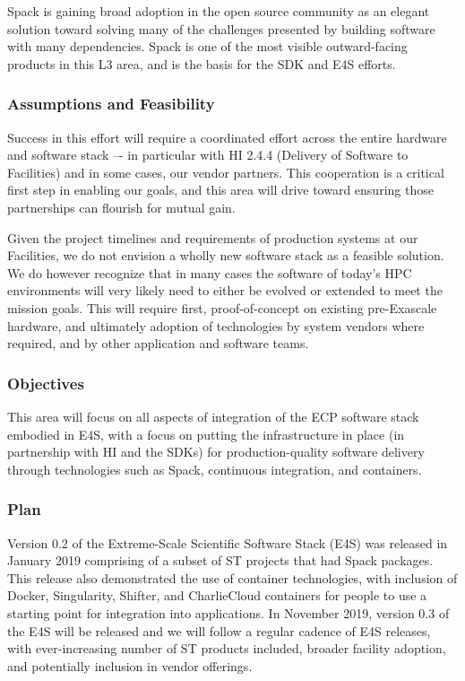 Spack is gaining broad adoption in the open source community as an elegant solution toward solving many of the challenges presented by building software with many dependencies. Spack is one of the most visible outward-facing products in this L3 area, and is the basis for the SDK and E4S efforts.

\subsubsection{Assumptions and Feasibility}
Success in this effort will require a coordinated effort across the entire hardware and software stack –- in particular with HI 2.4.4 (Delivery of Software to Facilities) and in some cases, our vendor partners.  This cooperation is a critical first step in enabling our goals, and this area will drive toward ensuring those partnerships can flourish for mutual gain.

Given the project timelines and requirements of production systems at our Facilities, we do not envision a wholly new software stack as a feasible solution. We do however recognize that in many cases the software of today's HPC environments will very likely need to either be evolved or extended to meet the mission goals. This will require first, proof-of-concept on existing pre-Exascale hardware, and ultimately adoption of technologies by system vendors where required, and by other application and software teams.

\subsubsection{Objectives}
This area will focus on all aspects of integration of the ECP software stack embodied in E4S, with a focus on putting the infrastructure in place (in partnership with HI and the SDKs) for production-quality software delivery through technologies such as Spack, continuous integration, and containers. 

\subsubsection{Plan}
Version 0.2 of the Extreme-Scale Scientific Software Stack (E4S) was released in January 2019 comprising of a subset of ST projects that had Spack packages. This release also demonstrated the use of container technologies, with inclusion of Docker, Singularity, Shifter, and CharlieCloud containers for people to use a starting point for integration into applications. In November 2019, version 0.3 of the E4S will be released and we will follow a regular cadence of E4S releases, with ever-increasing number of ST products included, broader facility adoption, and potentially inclusion in vendor offerings.


